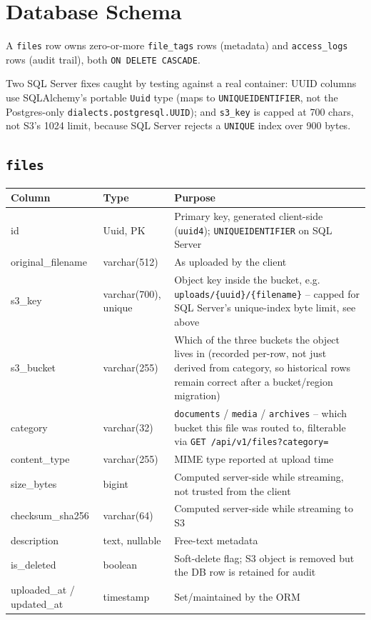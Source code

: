 \documentclass[10pt]{article}
\newcommand{\code}[1]{\texttt{\small\color{accentTeal}#1}}
\begin{document}
\section{Database Schema}
\label{sec:schema}

A \code{files} row owns zero-or-more \code{file\_tags} rows (metadata) and
\code{access\_logs} rows (audit trail), both \code{ON DELETE CASCADE}.

\begin{tipbox}
Two SQL Server fixes caught by testing against a real container: UUID
columns use SQLAlchemy's portable \texttt{Uuid} type (maps to
\texttt{UNIQUEIDENTIFIER}, not the Postgres-only \texttt{dialects.postgresql.UUID});
and \texttt{s3\_key} is capped at 700 chars, not S3's 1024 limit, because
SQL Server rejects a \texttt{UNIQUE} index over 900 bytes.
\end{tipbox}

\subsection{\texttt{files}}
\noindent \begin{tabularx}{\textwidth}{@{}l l X@{}}
\toprule
\rowcolor{tableHead} \textbf{Column} & \textbf{Type} & \textbf{Purpose} \\
\midrule
id & Uuid, PK & Primary key, generated client-side (\texttt{uuid4}); \texttt{UNIQUEIDENTIFIER} on SQL Server \\
\rowcolor{tableAlt} original\_filename & varchar(512) & As uploaded by the client \\
s3\_key & varchar(700), unique & Object key inside the bucket, e.g. \texttt{uploads/\{uuid\}/\{filename\}} -- capped for SQL Server's unique-index byte limit, see above \\
\rowcolor{tableAlt} s3\_bucket & varchar(255) & Which of the three buckets the object lives in (recorded per-row, not just derived from category, so historical rows remain correct after a bucket/region migration) \\
category & varchar(32) & \texttt{documents} / \texttt{media} / \texttt{archives} -- which bucket this file was routed to, filterable via \texttt{GET /api/v1/files?category=} \\
\rowcolor{tableAlt} content\_type & varchar(255) & MIME type reported at upload time \\
size\_bytes & bigint & Computed server-side while streaming, not trusted from the client \\
\rowcolor{tableAlt} checksum\_sha256 & varchar(64) & Computed server-side while streaming to S3 \\
description & text, nullable & Free-text metadata \\
\rowcolor{tableAlt} is\_deleted & boolean & Soft-delete flag; S3 object is removed but the DB row is retained for audit \\
uploaded\_at / updated\_at & timestamp & Set/maintained by the ORM \\
\bottomrule
\end{tabularx}
\end{document}
